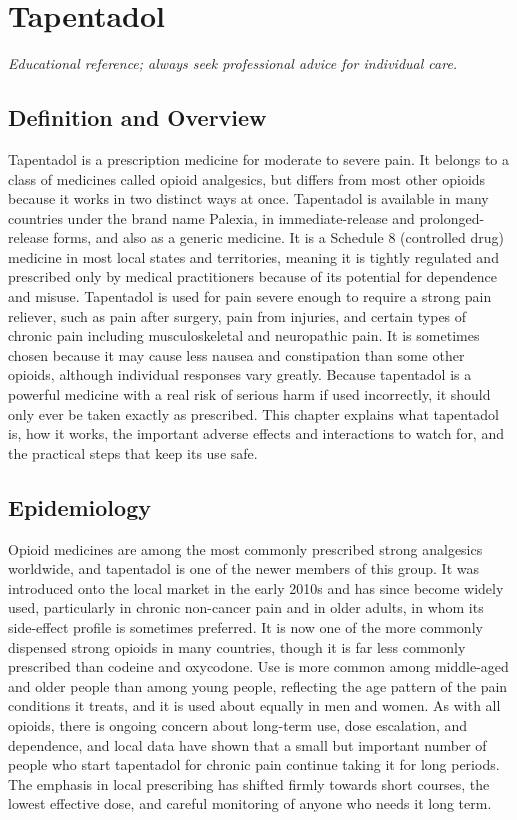 \chapter{Tapentadol}

\medskip
\noindent\textit{Educational reference; always seek professional advice for individual care.}

\section*{Definition and Overview}
Tapentadol is a prescription medicine for moderate to severe pain. It belongs to a class of medicines called opioid analgesics, but differs from most other opioids because it works in two distinct ways at once. Tapentadol is available in many countries under the brand name Palexia, in immediate-release and prolonged-release forms, and also as a generic medicine. It is a Schedule 8 (controlled drug) medicine in most local states and territories, meaning it is tightly regulated and prescribed only by medical practitioners because of its potential for dependence and misuse. Tapentadol is used for pain severe enough to require a strong pain reliever, such as pain after surgery, pain from injuries, and certain types of chronic pain including musculoskeletal and neuropathic pain. It is sometimes chosen because it may cause less nausea and constipation than some other opioids, although individual responses vary greatly. Because tapentadol is a powerful medicine with a real risk of serious harm if used incorrectly, it should only ever be taken exactly as prescribed. This chapter explains what tapentadol is, how it works, the important adverse effects and interactions to watch for, and the practical steps that keep its use safe.

\section*{Epidemiology}
Opioid medicines are among the most commonly prescribed strong analgesics worldwide, and tapentadol is one of the newer members of this group. It was introduced onto the local market in the early 2010s and has since become widely used, particularly in chronic non-cancer pain and in older adults, in whom its side-effect profile is sometimes preferred. It is now one of the more commonly dispensed strong opioids in many countries, though it is far less commonly prescribed than codeine and oxycodone. Use is more common among middle-aged and older people than among young people, reflecting the age pattern of the pain conditions it treats, and it is used about equally in men and women. As with all opioids, there is ongoing concern about long-term use, dose escalation, and dependence, and local data have shown that a small but important number of people who start tapentadol for chronic pain continue taking it for long periods. The emphasis in local prescribing has shifted firmly towards short courses, the lowest effective dose, and careful monitoring of anyone who needs it long term.


